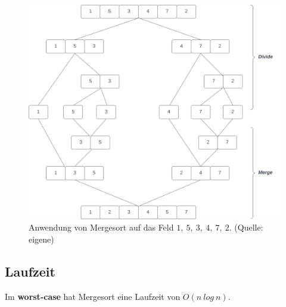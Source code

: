 \begin{figure}
    \begin{center}
        \includegraphics[scale=0.3]{chapters/Sortierverfahren/img/mergesort}
        \caption{Anwendung von Mergesort auf das Feld $1,\ 5,\ 3,\ 4,\ 7,\ 2$.  (Quelle: eigene)}
        \label{fig:mergesort}
    \end{center}
\end{figure}


\subsection{Laufzeit}
Im \textbf{worst-case} hat Mergesort eine Laufzeit von $O(n\ log\ n)$.